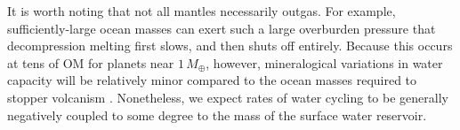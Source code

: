 \documentclass[fleqn,usenatbib]{mnras}
\newcommand{\todo}[1]{\textit{\textcolor{violet}{{#1}}}}
\begin{document}
It is worth noting that not all mantles necessarily outgas. For example, sufficiently-large ocean masses can exert such a large overburden pressure that decompression melting first slows, and then shuts off entirely. Because this occurs at tens of OM for planets near $1\,M_\oplus$, however, mineralogical variations in water capacity will be relatively minor compared to the ocean masses required to stopper volcanism \citep{kite_geodynamics_2009, noack_water-rich_2016}. Nonetheless, we expect rates of water cycling to be generally negatively coupled to some degree to the mass of the surface water reservoir. %








\end{document}
